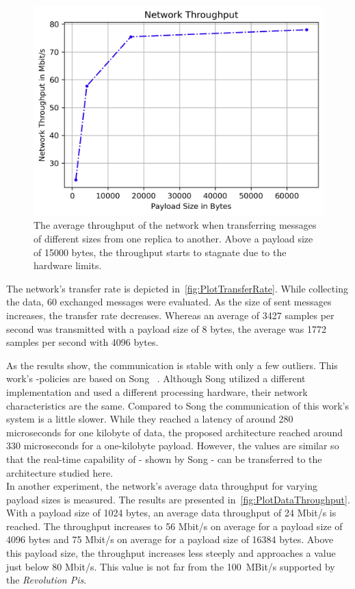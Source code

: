 \begin{figure}[!htb]
	\centering
	\includegraphics[width=0.8\linewidth]{images/plots/dataThroughput}
	\caption{The average throughput of the network when transferring messages of different sizes from one replica to another. Above a payload size of 15000 bytes, the throughput starts to stagnate due to the  hardware limits.}
	\label{fig:PlotDataThroughput}
\end{figure}

The network's transfer rate is depicted in~\autoref{fig:PlotTransferRate}.
While collecting the data, 60 exchanged messages were evaluated.
As the size of sent messages increases, the transfer rate decreases.
Whereas an average of 3427 samples per second was transmitted with a payload size of 8 bytes, the average was 1772 samples per second with 4096 bytes.

As the results show, the communication is stable with only a few outliers.
This work's -policies are based on Song \etal~\cite{SongDDSInRealTimeSystems}.
Although Song \etal utilized a different  implementation and used a different processing hardware, their network characteristics are the same.
Compared to Song \etal the communication of this work's system is a little slower.
While they reached a latency of around 280 microseconds for one kilobyte of data, the proposed architecture reached around 330 microseconds for a one-kilobyte payload.
However, the values are similar so that the real-time capability of  - shown by Song \etal - can be transferred to the architecture studied here.
\\

In another experiment, the network's average data throughput for varying payload sizes is measured.
The results are presented in~\autoref{fig:PlotDataThroughput}.
With a payload size of 1024 bytes, an average data throughput of 24 Mbit/s is reached.
The throughput increases to 56 Mbit/s on average for a payload size of 4096 bytes and 75 Mbit/s on average for a payload size of 16384 bytes.
Above this payload size, the throughput increases less steeply and approaches a value just below 80 Mbit/s.
This value is not far from the 100~MBit/s supported by the \textit{Revolution Pis}.
\\

